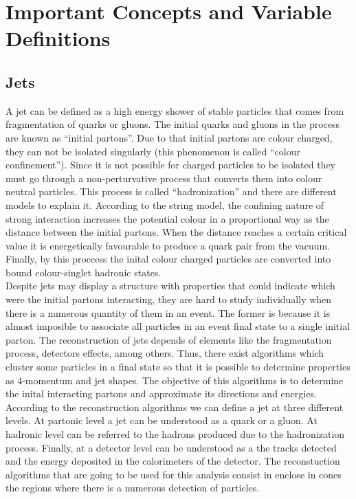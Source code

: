  \chapter{Important Concepts and Variable Definitions}\label{Important_concepts_chapter}
 
 \section{Jets}
 A jet can be defined as a high energy shower of stable particles that comes from fragmentation of quarks or gluons. The initial quarks and gluons in the process are known as ``initial partons''.
 Due to that initial partons are colour charged, they can not be isolated singularly (this phenomenon is called ``colour confinement''). Since it is not possible for charged particles to be isolated 
 they must go through a non-perturvative process that converts them into colour neutral particles. This process is called ``hadronization'' and there are different models to explain it. According to 
 the string model, the confining nature of strong interaction increases the potential colour in a proportional way as the distance between the initial partons. When the distance reaches a certain 
 critical value it is energetically favourable to produce a quark pair from the vacuum. Finally, by this proccess the inital colour charged particles are converted into bound colour-singlet hadronic 
 states. \\
 
 Despite jets may display a structure with properties that could indicate which were the initial partons interacting, they are hard to study individually when there is a numerous quantity of them
 in an event. The former is because it is almost imposible to associate all particles in an event final state to a single initial parton. The reconstruction of jets depends of elements like the 
 fragmentation process, detectors effects, among others. Thus, there exist algorithms which cluster some particles in a final state so that it is possible to determine properties as 4-momentum 
 and jet shapes. The objective of this algorithms is to determine the inital interacting partons and approximate its directions and energies. \\
 
 According to the reconstruction algorithms we can define a jet at three different levels. At partonic level a jet can be understood as a quark or a gluon. At hadronic level can be referred to the
 hadrons produced due to the hadronization process. Finally, at a detector level can be understood as a the tracks detected and the energy deposited in the calorimeters of the detector. The 
 reconstuction algorithms that are going to be used for this analysis consist in enclose in cones the regions where there is a numerous detection of particles. 
 
